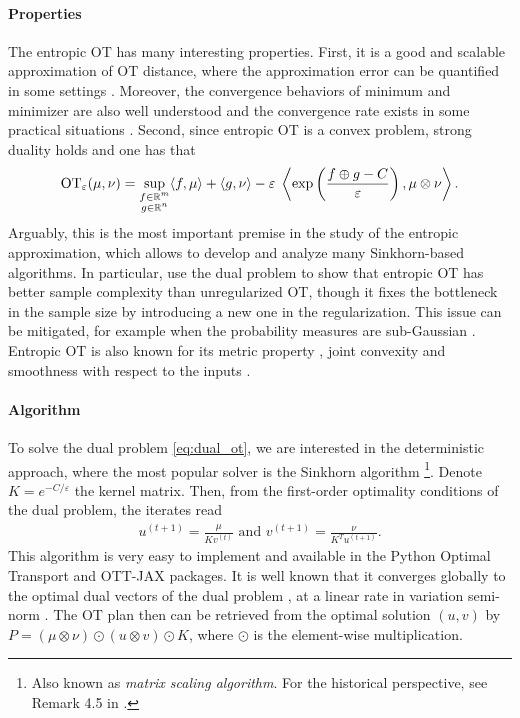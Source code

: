 \paragraph{Properties} The entropic OT has many interesting properties. First, it is a
good and scalable approximation of OT distance,
where the approximation error can be quantified in some settings \citep{Genevay19,Luise18}.
Moreover, the convergence behaviors of minimum and minimizer are also well understood
\citep{Leonard12,Carlier17} and the convergence rate exists in some practical situations
\citep{Genevay19,Cominetti94,Weed18}.
Second, since entropic OT is a convex problem, strong duality holds and one has that
\begin{align}
  \label{eq:dual_ot}
  \text{OT}_{\varepsilon}(\mu, \nu) = \sup_{\substack{f \in \mathbb R^m \\ g \in \mathbb R^n}}
  \langle f, \mu \rangle + \langle g, \nu \rangle
  - \varepsilon \; \left\langle \exp \left( \frac{f \oplus g - C}{\varepsilon} \right), \mu \otimes \nu \right\rangle.
\end{align}
Arguably, this is the most important premise in the study of the entropic approximation, which
allows to develop and analyze many Sinkhorn-based algorithms.
In particular, \citet{Genevay19} use the dual problem to show that entropic OT
has better sample complexity than unregularized OT,
though it fixes the bottleneck in the sample size by introducing a new one in the regularization.
This issue can be mitigated, for example when the probability measures are sub-Gaussian \citep{Mena19}.
Entropic OT is also known for its metric property \citep{Sanjabi18}, joint convexity
and smoothness with respect to the inputs \citep{Luise18}.

\paragraph{Algorithm} To solve the dual problem \eqref{eq:dual_ot},
we are interested in the deterministic approach, where the most popular solver
is the Sinkhorn algorithm \citep{Sinkhorn67}
\footnote{Also known as \textit{matrix scaling algorithm}.
For the historical perspective, see Remark 4.5 in \citep{Peyre19}.}.
Denote $K = e^{-C / \varepsilon}$ the kernel matrix. Then,
from the first-order optimality conditions of the dual problem, the iterates read
\begin{align}
  u^{(t+1)} = \frac{\mu}{Kv^{(t)}} \text{ and } v^{(t+1)} = \frac{\nu}{K^T u^{(t+1)}}.
\end{align}
This algorithm is very easy to implement and available in the Python Optimal Transport
\citep{Flamary21} and OTT-JAX \citep{Cuturi22} packages.
It is well known that it converges globally to the optimal dual vectors of the dual problem
\citep{Sinkhorn67}, at a linear rate in variation semi-norm \citep{Franklin89}.
The OT plan then can be retrieved from the optimal solution $(u, v)$ by
$P = (\mu \otimes \nu) \odot (u \otimes v) \odot K$, where $\odot$ is the element-wise multiplication.

